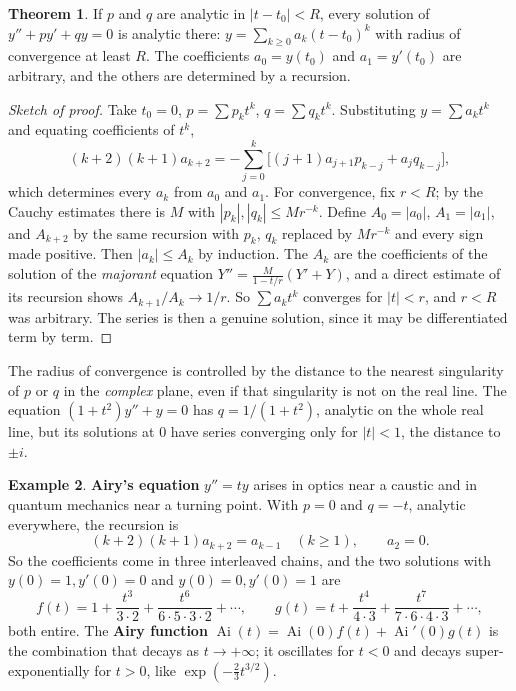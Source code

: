 \documentclass[11pt,a4paper]{article}
\numberwithin{equation}{section}
\theoremstyle{definition}
\newtheorem{thm}{Theorem}[subsection]
\newtheorem{exa}[thm]{Example}
\begin{document}
\begin{thm}
\label{thm:analytic}
If $p$ and $q$ are analytic in $|t - t_0| < R$, every solution of $y'' + py' + qy = 0$ is analytic there: $y = \sum_{k\geq0}a_k(t - t_0)^k$ with radius of convergence at least $R$. The coefficients $a_0 = y(t_0)$ and
$a_1 = y'(t_0)$ are arbitrary, and the others are determined by a recursion.
\end{thm}

\begin{proof}[Sketch of proof]
Take $t_0 = 0$, $p = \sum p_kt^k$, $q = \sum q_kt^k$. Substituting $y = \sum a_kt^k$ and equating coefficients of $t^k$,
\[
(k + 2)(k + 1)a_{k+2} = -\sum_{j=0}^k\bigl[(j + 1)a_{j+1}p_{k-j} + a_jq_{k-j}\bigr] ,
\]
which determines every $a_k$ from $a_0$ and $a_1$. For convergence, fix $r < R$; by the Cauchy estimates there is $M$ with $|p_k|, |q_k| \leq Mr^{-k}$. Define $A_0 = |a_0|$, $A_1 = |a_1|$, and $A_{k+2}$ by the same
recursion with $p_k$, $q_k$ replaced by $Mr^{-k}$ and every sign made positive. Then $|a_k| \leq A_k$ by induction. The $A_k$ are the coefficients of the solution of the \emph{majorant} equation
$Y'' = \frac{M}{1 - t/r}(Y' + Y)$, and a direct estimate of its recursion shows $A_{k+1}/A_k \to 1/r$. So $\sum a_kt^k$ converges for $|t| < r$, and $r < R$ was arbitrary. The series is then a genuine solution,
since it may be differentiated term by term.
\end{proof}

The radius of convergence is controlled by the distance to the nearest singularity of $p$ or $q$ in the \emph{complex} plane, even if that singularity is not on the real line. The
equation $(1 + t^2)y'' + y = 0$ has $q = 1/(1 + t^2)$, analytic on the whole real line, but its solutions at $0$ have series converging only for $|t| < 1$, the distance to $\pm i$.

\begin{exa}
\label{ex:airy}
\textbf{Airy's equation} $y'' = ty$ arises in optics near a caustic and in quantum mechanics near a turning point. With $p = 0$ and $q = -t$, analytic everywhere, the recursion is
\[
(k + 2)(k + 1)a_{k+2} = a_{k-1} \quad (k \geq 1), \qquad a_2 = 0 .
\]
So the coefficients come in three interleaved chains, and the two solutions with $y(0) = 1, y'(0) = 0$ and $y(0) = 0, y'(0) = 1$ are
\[
f(t) = 1 + \frac{t^3}{3 \cdot 2} + \frac{t^6}{6 \cdot 5 \cdot 3 \cdot 2} + \cdots, \qquad g(t) = t + \frac{t^4}{4 \cdot 3} + \frac{t^7}{7 \cdot 6 \cdot 4 \cdot 3} + \cdots ,
\]
both entire. The \textbf{Airy function} $\operatorname{Ai}(t) = \operatorname{Ai}(0)f(t) + \operatorname{Ai}'(0)g(t)$ is the combination that decays as $t \to +\infty$; it oscillates for $t < 0$ and decays super-exponentially for $t > 0$,
like $\exp(-\frac23t^{3/2})$.
\end{exa}
\end{document}
